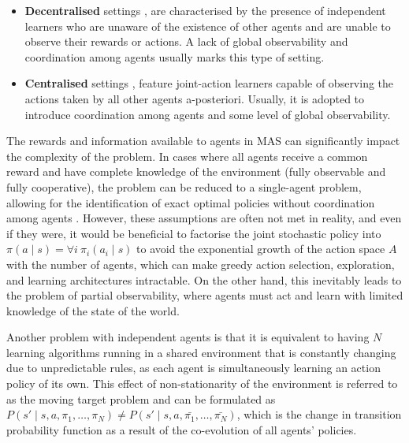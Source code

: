 \documentclass[a4paper,singleside,12pt]{report} %
\begin{document}
\begin{itemize}
\item
  \textbf{Decentralised} settings \cite{Bowling2002MultiagentLU, kapetanakis2002reinforcement}, are characterised by the presence of independent learners who are unaware of the existence of other agents and are unable to observe their rewards or actions. A lack of global observability and coordination among agents usually marks this type of setting.
\item
  \textbf{Centralised} settings \cite{hu2003nash, littman2001friend}, feature joint-action learners capable of observing the actions taken by all other agents a-posteriori. Usually, it is adopted to introduce coordination among agents and some level of global observability.
\end{itemize}

The rewards and information available to agents in MAS can significantly impact the complexity of the problem. In cases where all agents receive a common reward and have complete knowledge of the environment (fully observable and fully cooperative), the problem can be reduced to a single-agent problem, allowing for the identification of exact optimal policies without coordination among agents \cite{HernandezLeal2017ASO}. However, these assumptions are often not met in reality, and even if they were, it would be beneficial to factorise the joint stochastic policy into ${\pi(a \mid s) = \forall i\ \pi_i (a_i \mid s)}$ to avoid the exponential growth of the action space $A$ with the number of agents, which can make greedy action selection, exploration, and learning architectures intractable. On the other hand, this inevitably leads to the problem of partial observability, where agents must act and learn with limited knowledge of the state of the world. 

Another problem with independent agents is that it is equivalent to having $N$ learning algorithms running in a shared environment that is constantly changing due to unpredictable rules, as each agent is simultaneously learning an action policy of its own. This effect of non-stationarity of the environment is referred to as the moving target problem and can be formulated as \(P(s' \mid s, a, \pi_1, \dots, \pi_N) \neq P(s' \mid s, a, \bar{\pi_1}, \dots, \bar{\pi_N})\), which is the change in transition probability function as a result of the co-evolution of all agents' policies.
\end{document}
